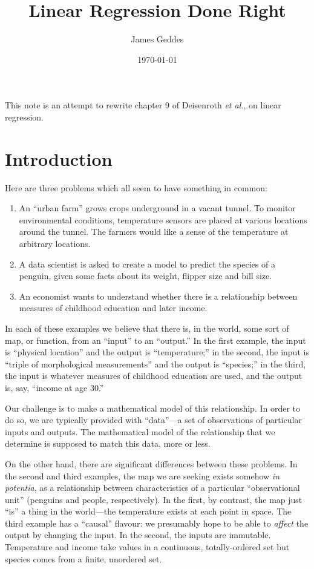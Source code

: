 \documentclass[11pt, a4paper]{article}
\author{James Geddes}
\date{\today}
\title{Linear Regression Done Right}
\begin{document}
\maketitle

This note is an attempt to rewrite chapter 9 of Deisenroth \emph{et
al.}, on linear regression.

\section*{Introduction}

Here are three problems which all seem to have something in common:

\begin{enumerate}
\item An ``urban farm'' grows crops underground in a vacant tunnel. To
  monitor environmental conditions, temperature sensors are placed at
  various locations around the tunnel. The farmers would like a sense
  of the temperature at arbitrary locations.
\item A data scientist is asked to create a model to predict the
  species of a penguin, given some facts about its weight, flipper
  size and bill size.
\item An economist wants to understand whether there is a relationship
  between measures of childhood education and later income.
\end{enumerate}

In each of these examples we believe that there is, in the world, some
sort of map, or function, from an “input” to an “output.” In the first
example, the input is “physical location” and the output is
“temperature;” in the second, the input is “triple of morphological
measurements” and the output is “species;” in the third, the input is
whatever measures of childhood education are used, and the output is,
say, “income at age 30.”

Our challenge is to make a mathematical model of this relationship. In
order to do so, we are typically provided with “data”---a set of
observations of particular inputs and outputs. The mathematical model
of the relationship that we determine is supposed to match this data,
more or less.

On the other hand, there are significant differences between these
problems. In the second and third examples, the map we are seeking
exists somehow \emph{in potentia}, as a relationship between
characteristics of a particular “observational unit” (penguins and
people, respectively). In the first, by contrast, the map just “is” a
thing in the world---the temperature exists at each point in space. The
third example has a “causal” flavour: we presumably hope to be able to
\emph{affect} the output by changing the input. In the second, the
inputs are immutable. Temperature and income take values in a
continuous, totally-ordered set but species comes from a finite,
unordered set. 
\end{document}
